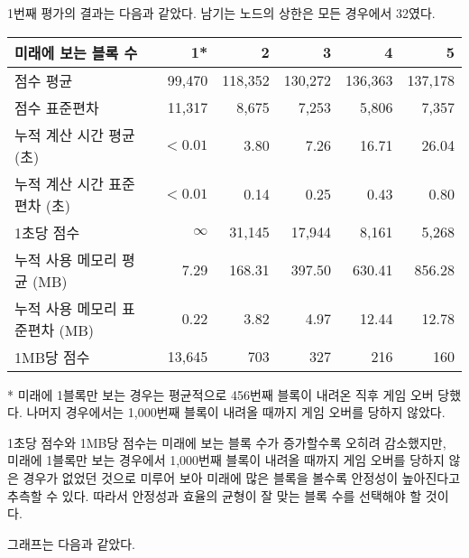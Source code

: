 1번째 평가의 결과는 다음과 같았다. 남기는 노드의 상한은 모든 경우에서 32였다.
\begin{center}
    \begin{tabular}{l|r|r|r|r|r}
        미래에 보는 블록 수 & 1* & 2 & 3 & 4 & 5 \\
        \hline
        점수 평균 & 99,470 & 118,352 & 130,272 & 136,363 & 137,178 \\
        점수 표준편차 & 11,317 & 8,675 & 7,253 & 5,806 & 7,357 \\
        \hline
        누적 계산 시간 평균 (초) & $<0.01$ & 3.80 & 7.26 & 16.71 & 26.04 \\
        누적 계산 시간 표준편차 (초) & $<0.01$ & 0.14 & 0.25 & 0.43 & 0.80 \\
        1초당 점수 & $\infty$ & 31,145 & 17,944 & 8,161 & 5,268 \\
        \hline
        누적 사용 메모리 평균 (MB) & 7.29 & 168.31 & 397.50 & 630.41 & 856.28 \\
        누적 사용 메모리 표준편차 (MB) & 0.22 & 3.82 & 4.97 & 12.44 & 12.78 \\
        1MB당 점수 & 13,645 & 703 & 327 & 216 & 160 \\
    \end{tabular}
\end{center}
* 미래에 1블록만 보는 경우는 평균적으로 456번째 블록이 내려온 직후 게임 오버 당했다.
나머지 경우에서는 1,000번째 블록이 내려올 때까지 게임 오버를 당하지 않았다.

1초당 점수와 1MB당 점수는 미래에 보는 블록 수가 증가할수록 오히려 감소했지만,
미래에 1블록만 보는 경우에서 1,000번째 블록이 내려올 때까지 게임 오버를 당하지 않은
경우가 없었던 것으로 미루어 보아 미래에 많은 블록을 볼수록 안정성이 높아진다고
추측할 수 있다. 따라서 안정성과 효율의 균형이 잘 맞는 블록 수를 선택해야 할 것이다.

그래프는 다음과 같았다.

